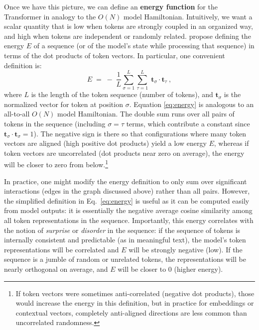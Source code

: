 \documentclass[12pt]{article}
\begin{document}
Once we have this picture, we can define an \textbf{energy function} for the Transformer in analogy to the $O(N)$ model Hamiltonian. Intuitively, we want a scalar quantity that is low when tokens are strongly coupled in an organized way, and high when tokens are independent or randomly related. \citet{sun2025} propose defining the energy $E$ of a sequence (or of the model's state while processing that sequence) in terms of the dot products of token vectors. In particular, one convenient definition is:
\begin{equation}
E \;=\; -\; \frac{1}{L} \sum_{\sigma=1}^{L} \sum_{\tau=1}^{L} \; \mathbf{t}_\sigma \cdot \mathbf{t}_\tau~,
\label{eq:energy}
\end{equation}
where $L$ is the length of the token sequence (number of tokens), and $\mathbf{t}_\sigma$ is the normalized vector for token at position $\sigma$. Equation \eqref{eq:energy} is analogous to an all-to-all $O(N)$ model Hamiltonian. The double sum runs over all pairs of tokens in the sequence (including $\sigma=\tau$ terms, which contribute a constant since $\mathbf{t}_\sigma\cdot\mathbf{t}_\sigma = 1$). The negative sign is there so that configurations where many token vectors are aligned (high positive dot products) yield a low energy $E$, whereas if token vectors are uncorrelated (dot products near zero on average), the energy will be closer to zero from below.\footnote{If token vectors were sometimes anti-correlated (negative dot products), those would increase the energy in this definition, but in practice for embeddings or contextual vectors, completely anti-aligned directions are less common than uncorrelated randomness.}

In practice, one might modify the energy definition to only sum over significant interactions (edges in the graph discussed above) rather than all pairs. However, the simplified definition in Eq.~\eqref{eq:energy} is useful as it can be computed easily from model outputs: it is essentially the negative average cosine similarity among all token representations in the sequence. Importantly, this energy correlates with the notion of \emph{surprise} or \emph{disorder} in the sequence: if the sequence of tokens is internally consistent and predictable (as in meaningful text), the model's token representations will be correlated and $E$ will be strongly negative (low). If the sequence is a jumble of random or unrelated tokens, the representations will be nearly orthogonal on average, and $E$ will be closer to 0 (higher energy).
\end{document}
